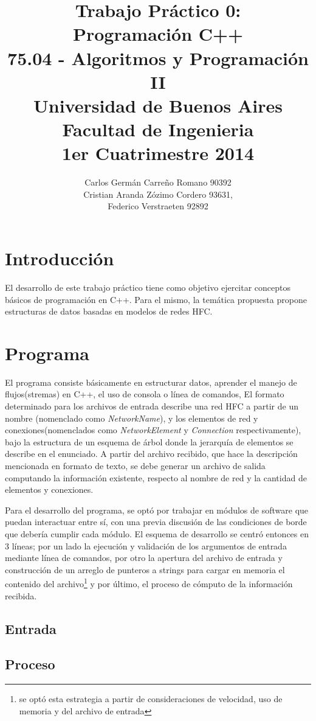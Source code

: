 \documentclass[10pt,a4paper]{report}
\author{ Carlos Germán Carreño Romano 90392\\
 Cristian Aranda Zózimo Cordero 93631,\\
  Federico Verstraeten 92892}
\title{Trabajo Práctico 0:\\
Programación C++\\
75.04 - Algoritmos y Programación II\\
Universidad de Buenos Aires\\
Facultad de Ingenieria\\
1er Cuatrimestre 2014\\ 
}
\begin{document}
\maketitle
\tableofcontents
\section{Introducción}
El desarrollo de este trabajo práctico tiene como objetivo ejercitar conceptos básicos de programación en C++. Para el mismo, la temática propuesta propone estructuras de datos basadas en modelos de redes HFC. 

\section{Programa}
El programa consiste básicamente en estructurar datos, aprender el manejo de flujos(stremas) en C++, el uso de consola o línea de comandos, 
El formato determinado para los archivos de entrada describe una red HFC a partir de un nombre (nomenclado como \textit{NetworkName}), y los elementos de red y conexiones(nomenclados como \textit{NetworkElement} y \textit{Connection} respectivamente), bajo la estructura de un esquema de árbol donde la jerarquía de elementos se describe en el enunciado. A partir del archivo recibido, que hace la descripción mencionada en formato de texto, se debe generar un archivo de salida computando la información existente, respecto al nombre de red y  la cantidad de elementos y conexiones.

Para el desarrollo del programa, se optó por trabajar en módulos de software que puedan interactuar entre sí, con una previa discusión de las condiciones de borde que debería cumplir cada módulo. El esquema de desarrollo se centró entonces en 3 líneas; por un lado la ejecución y validación de los argumentos de entrada mediante línea de comandos, por otro la apertura del archivo de entrada y construcción de un arreglo de punteros a strings para cargar en memoria el contenido del archivo\footnote{se optó esta estrategia a partir de consideraciones de velocidad, uso de memoria y del archivo de entrada} y por último, el proceso de cómputo de la información recibida.

\subsection{Entrada}

\subsection{Proceso}
\end{document}
